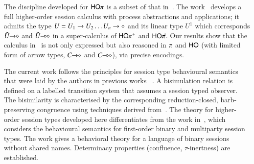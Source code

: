 The discipline developed for $\mathsf{HO}\pi$ is a subset of that in~\cite{tlca07,MostrousY15}.
The work~\cite{tlca07} develops a full higher-order session calculus
with process abstractions and applications; it admits the type 
$U=U_1 \rightarrow U_2 \dots U_n \rightarrow \diamond$ and its linear type 
$U^1$
which corresponds $\tilde{U}\!\! \rightarrow\!\! \diamond$ and $\tilde{U}\!\! \multimap\!\! \diamond$ in 
a super-calculus of $\mathsf{HO\pi^{+}}$ and $\mathsf{HO}{\vec{\pi}}$. 
Our results show that
the calculus in~\cite{tlca07} is not only expressed but 
also reasoned in 
$\pi$ and $\mathsf{HO}$ (with limited form of arrow types, $C\!\! \rightarrow\!\! \diamond$ and $C\!\! \multimap\!\! \diamond$), via precise encodings. 

The current work follows the principles for
session type behavioural semantics that were laid
by the
authors in previous works ~\cite{KYHH2015,KY2015,DBLP:journals/iandc/PerezCPT14}.
A bisimulation relation is defined on a labelled
transition system that assumes a session typed
observer.
The bisimilarity is characterised by the corresponding
reduction-closed, barb-preserving congruence using techniques derived from~\cite{Hennessy07}.
The theory for higher-order session types developed here
differentiates from 
the work in~\cite{KYHH2015,KY2015}, which 
considers the behavioural semantics for first-order
binary and multiparty session types.
The work \cite{DBLP:journals/iandc/PerezCPT14} gives a behavioral theory 
for a language of binary sessions without shared names.
Determinacy properties (confluence, $\tau$-inertness) are established.

